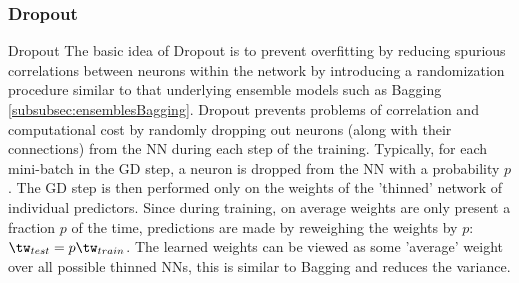 \subsubsection{Dropout}
\label{subsubsec:dnnRegularizerPracticalDropout}
\begin{mybox}{Dropout}
The basic idea of Dropout is to prevent overfitting by reducing spurious correlations between neurons within the network by introducing a randomization procedure similar to that underlying ensemble models such as Bagging \ref{subsubsec:ensemblesBagging}. Dropout prevents problems of correlation and computational cost by randomly dropping out neurons (along with their connections) from the NN during each step of the training. Typically, for each mini-batch in the GD step, a neuron is dropped from the NN with a probability $p$. The GD step is then performed only on the weights of the ’thinned’ network of individual predictors. Since during training, on average weights are only present a fraction $p$ of the time, predictions are made by reweighing the weights by $p$: $\tw_{test} = p\tw_{train}$. The learned weights can be viewed as some ’average’ weight over all possible thinned NNs, this is similar to Bagging and reduces the variance.
\end{mybox}
